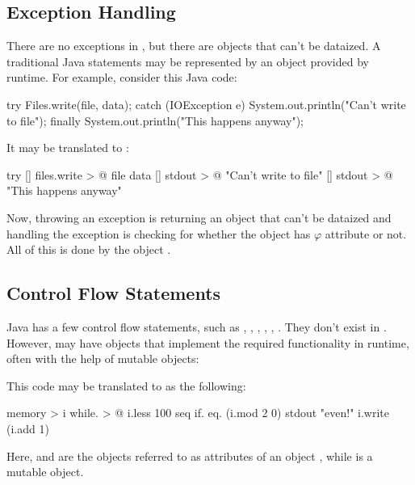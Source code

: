 \subsection{Exception Handling}

There are no exceptions in \eo{}, but there are objects that
can't be dataized. A traditional Java  statements
may be represented by an object  provided by \eo{} runtime.
For example, consider this Java code:

\begin{ffcode}
try {
  Files.write(file, data);
} catch (IOException e) {
  System.out.println("Can't write to file");
} finally {
  System.out.println("This happens anyway");
}
\end{ffcode}

It may be translated to \eo{}:

\begin{twocols}
\begin{ffcode}
try
  []
    files.write > @
      file
      data
  []
    stdout > @
      "Can't write to file"
  []
    stdout > @
      "This happens anyway"
\end{ffcode}
\end{twocols}

Now, throwing an exception is returning an object that can't be
dataized and handling the exception is checking for whether the
object has $\varphi$ attribute or not. All of this is done
by the object .

\subsection{Control Flow Statements}

Java has a few control flow statements, such as
, , , , , .
They don't exist in \eo{}. However, \eo{} may have objects
that implement the required functionality in runtime, often with the
help of mutable objects:


This code may be translated to \eo{} as the following:

\begin{ffcode}
[]
  memory > i
  while. > @
    i.less 100
    seq
      if.
        eq. (i.mod 2 0)
        stdout "even!"
      i.write (i.add 1)
\end{ffcode}

Here,  and  are the objects referred to as attributes of an object
, while  is a mutable object.
